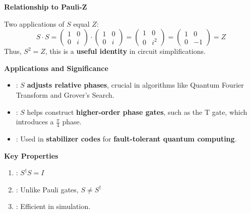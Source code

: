 \highspace
\begin{flushleft}
    \textcolor{Green3}{ \textbf{Relationship to Pauli-Z}}
\end{flushleft}
Two applications of $S$ equal $Z$:
\begin{equation*}
    S \cdot S = 
    \begin{pmatrix}
        1 & 0 \\ 0 & i
    \end{pmatrix}
    \cdot
    \begin{pmatrix}
        1 & 0 \\ 0 & i
    \end{pmatrix}
    =
    \begin{pmatrix}
        1 & 0 \\ 0 & i^{2}
    \end{pmatrix}
    =
    \begin{pmatrix}
        1 & 0 \\ 0 & -1
    \end{pmatrix}
    = Z
\end{equation*}
Thus, $S^{2} = Z$, this is a \textbf{useful identity} in circuit simplifications.

\highspace
\begin{flushleft}
    \textcolor{Green3}{ \textbf{Applications and Significance}}
\end{flushleft}
\begin{itemize}
    \item {}: $S$ \textbf{adjusts relative phases}, crucial in algorithms like Quantum Fourier Transform and Grover's Search.
    \item {}: $S$ helps construct \textbf{higher-order phase gates}, such as the T gate, which introduces a $\frac{\pi}{4}$ phase.
    \item {}: Used in \textbf{stabilizer codes} for \textbf{fault-tolerant quantum computing}.
\end{itemize}

\highspace
\begin{flushleft}
    \textcolor{Green3}{ \textbf{Key Properties}}
\end{flushleft}
\begin{enumerate}
    \item {}: $S^{\dagger} S = I$
    \item {}: Unlike Pauli gates, $S \ne S^{\dagger}$
    \item {}: Efficient in simulation.
\end{enumerate}